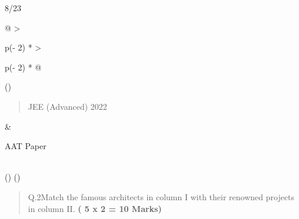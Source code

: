 \documentclass[
]{article}
\begin{document}
8/23

\begin{longtable}[]{@{}
  >{\raggedright\arraybackslash}p{(\columnwidth - 2\tabcolsep) * }
  >{\raggedright\arraybackslash}p{(\columnwidth - 2\tabcolsep) * }@{}}
\toprule()
\begin{minipage}[b]{\linewidth}\raggedright
\begin{quote}
JEE (Advanced) 2022
\end{quote}
\end{minipage} & \begin{minipage}[b]{\linewidth}\raggedright
AAT Paper
\end{minipage} \\
\midrule()
\endhead
\bottomrule()
\end{longtable}

\begin{quote}
Q.2Match the famous architects in column I with their renowned projects
in column II. \textbf{( 5 x 2 = 10 Marks)}
\end{quote}
\end{document}
